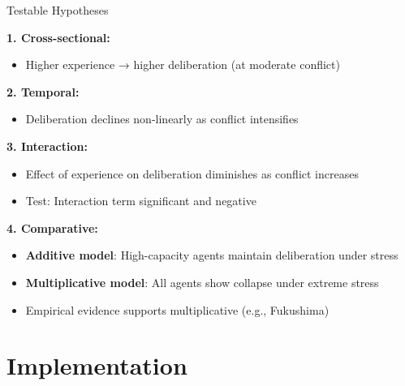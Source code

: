 \documentclass[aspectratio=169]{beamer}
\begin{document}
\begin{frame}{Testable Hypotheses}

\textbf{1. Cross-sectional:} 
\begin{itemize}
    \item Higher experience → higher deliberation (at moderate conflict)
\end{itemize}

\textbf{2. Temporal:}
\begin{itemize}
    \item Deliberation declines non-linearly as conflict intensifies
\end{itemize}

\textbf{3. Interaction:}
\begin{itemize}
    \item Effect of experience on deliberation diminishes as conflict increases
    \item Test: Interaction term significant and negative
\end{itemize}

\textbf{4. Comparative:}
\begin{itemize}
    \item \textbf{Additive model}: High-capacity agents maintain deliberation under stress
    \item \textbf{Multiplicative model}: All agents show collapse under extreme stress
    \item Empirical evidence supports multiplicative (e.g., Fukushima)
\end{itemize}

\end{frame}

\section{Implementation}
\end{document}
